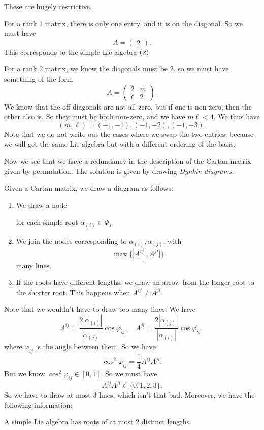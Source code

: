\documentclass[a4paper]{article}
\begin{document}
These are hugely restrictive.
\begin{eg}
  For a rank $1$ matrix, there is only one entry, and it is on the diagonal. So we must have
  \[
    A = 
    \begin{pmatrix}
      2
    \end{pmatrix}.
  \]
  This corresponds to the simple Lie algebra $\sl(2)$.
\end{eg}

\begin{eg}
  For a rank $2$ matrix, we know the diagonals must be $2$, so we must have something of the form
  \[
    A =
    \begin{pmatrix}
      2 & m\\
      \ell & 2
    \end{pmatrix}.
  \]
  We know that the off-diagonals are not all zero, but if one is non-zero, then the other also is. So they must be both non-zero, and we have $m\ell < 4$. We thus have
  \[
    (m, \ell) = (-1, -1), (-1, -2), (-1, -3).
  \]
  Note that we do not write out the cases where we swap the two entries, because we will get the same Lie algebra but with a different ordering of the basis.
\end{eg}

Now we see that we have a redundancy in the description of the Cartan matrix given by permutation. The solution is given by drawing \emph{Dynkin diagrams}.
\begin{defi}
  Given a Cartan matrix, we draw a diagram as follows:
  \begin{enumerate}
    \item We draw a node 
      \begin{center}
      \end{center}
      for each simple root $\alpha_{(i)} \in \Phi_s$.
    \item We join the nodes corresponding to $\alpha_{(i)}, \alpha_{(j)}$, with
      \[
        \max\{|A^{ij}|, A^{ji}|\}
      \]
      many lines.
    \item If the roots have different lengths, we draw an arrow from the longer root to the shorter root. This happens when $A^{ij} \not= A^{ji}$.
  \end{enumerate}
\end{defi}
Note that we wouldn't have to draw too many lines. We have
\[
  A^{ij} = \frac{2|\alpha_{(i)}|}{|\alpha_{(j)}|} \cos \varphi_{ij},\quad A^{ji} = \frac{2|\alpha_{(j)}|}{|\alpha_{(i)}|} \cos \varphi_{ij},
\]
where $\varphi_{ij}$ is the angle between them. So we have
\[
  \cos^2 \varphi_{ij} = \frac{1}{4} A^{ij} A^{ji}.
\]
But we know $\cos^2 \varphi_{ij} \in [0, 1]$. So we must have
\[
  A^{ij} A^{ji} \in \{0, 1, 2, 3\}.
\]
So we have to draw at most $3$ lines, which isn't that bad. Moreover, we have the following information:
\begin{prop}
  A simple Lie algebra has roots of at most $2$ distinct lengths.
\end{prop}
\end{document}
